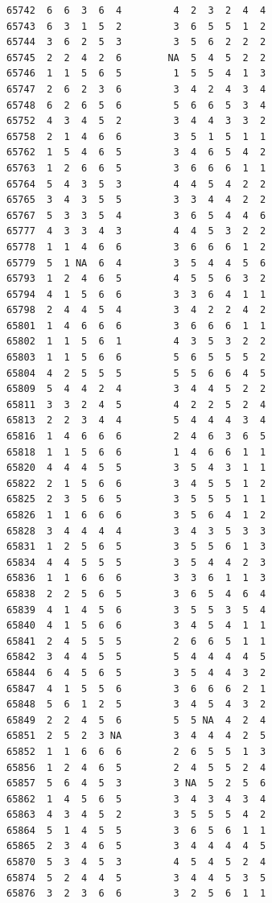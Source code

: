 \documentclass[
  letterpaper,
  DIV=11,
  numbers=noendperiod]{scrreprt}
\begin{document}
\begin{verbatim}
65742  6  6  3  6  4         4  2  3  2  4  4
65743  6  3  1  5  2         3  6  5  5  1  2
65744  3  6  2  5  3         3  5  6  2  2  2
65745  2  2  4  2  6        NA  5  4  5  2  2
65746  1  1  5  6  5         1  5  5  4  1  3
65747  2  6  2  3  6         3  4  2  4  3  4
65748  6  2  6  5  6         5  6  6  5  3  4
65752  4  3  4  5  2         3  4  4  3  3  2
65758  2  1  4  6  6         3  5  1  5  1  1
65762  1  5  4  6  5         3  4  6  5  4  2
65763  1  2  6  6  5         3  6  6  6  1  1
65764  5  4  3  5  3         4  4  5  4  2  2
65765  3  4  3  5  5         3  3  4  4  2  2
65767  5  3  3  5  4         3  6  5  4  4  6
65777  4  3  3  4  3         4  4  5  3  2  2
65778  1  1  4  6  6         3  6  6  6  1  2
65779  5  1 NA  6  4         3  5  4  4  5  6
65793  1  2  4  6  5         4  5  5  6  3  2
65794  4  1  5  6  6         3  3  6  4  1  1
65798  2  4  4  5  4         3  4  2  2  4  2
65801  1  4  6  6  6         3  6  6  6  1  1
65802  1  1  5  6  1         4  3  5  3  2  2
65803  1  1  5  6  6         5  6  5  5  5  2
65804  4  2  5  5  5         5  5  6  6  4  5
65809  5  4  4  2  4         3  4  4  5  2  2
65811  3  3  2  4  5         4  2  2  5  2  4
65813  2  2  3  4  4         5  4  4  4  3  4
65816  1  4  6  6  6         2  4  6  3  6  5
65818  1  1  5  6  6         1  4  6  6  1  1
65820  4  4  4  5  5         3  5  4  3  1  1
65822  2  1  5  6  6         3  4  5  5  1  2
65825  2  3  5  6  5         3  5  5  5  1  1
65826  1  1  6  6  6         3  5  6  4  1  2
65828  3  4  4  4  4         3  4  3  5  3  3
65831  1  2  5  6  5         3  5  5  6  1  3
65834  4  4  5  5  5         3  5  4  4  2  3
65836  1  1  6  6  6         3  3  6  1  1  3
65838  2  2  5  6  5         3  6  5  4  6  4
65839  4  1  4  5  6         3  5  5  3  5  4
65840  4  1  5  6  6         3  4  5  4  1  1
65841  2  4  5  5  5         2  6  6  5  1  1
65842  3  4  4  5  5         5  4  4  4  4  5
65844  6  4  5  6  5         3  5  4  4  3  2
65847  4  1  5  5  6         3  6  6  6  2  1
65848  5  6  1  2  5         3  4  5  4  3  2
65849  2  2  4  5  6         5  5 NA  4  2  4
65851  2  5  2  3 NA         3  4  4  4  2  5
65852  1  1  6  6  6         2  6  5  5  1  3
65856  1  2  4  6  5         2  4  5  5  2  4
65857  5  6  4  5  3         3 NA  5  2  5  6
65862  1  4  5  6  5         3  4  3  4  3  4
65863  4  3  4  5  2         3  5  5  5  4  2
65864  5  1  4  5  5         3  6  5  6  1  1
65865  2  3  4  6  5         3  4  4  4  4  5
65870  5  3  4  5  3         4  5  4  5  2  4
65874  5  2  4  4  5         3  4  4  5  3  5
65876  3  2  3  6  6         3  2  5  6  1  1

\end{verbatim}
\end{document}
